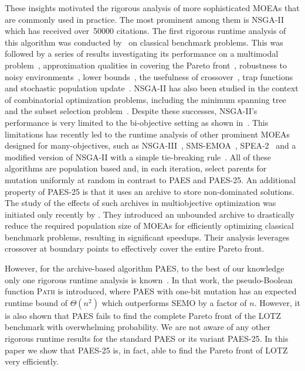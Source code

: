 \documentclass[
sigconf = false, %
review = false, %
screen = true, %
anonymous = true, %
format=acmsmall
]{acmart}
\newcommand{\LOTZ}{\textsc{LOTZ}\xspace}
\newcommand{\PAES}{PAES-25\xspace}
\begin{document}
These insights motivated the rigorous analysis of more sophisticated MOEAs that are commonly used in practice. The most prominent among them is NSGA-II~\cite{DebPAM02} which has received over~50000 citations. The first rigorous runtime analysis of this algorithm was conducted by~\citet{ZhengLuiDoerrAAAI22} on classical benchmark problems. This was followed by a series of results investigating its performance on a multimodal problem~\cite{Qu2022PPSN}, approximation qualities in covering the Pareto front~\citep{DoerrApprox}, robustness to noisy environments~\cite{DaOp2023}, lower bounds~\cite{DoerrQu2023a}, the usefulness of crossover~\citep{Dang2024,DoerrQu2022}, trap functions~\cite{DangEfficient2024} and stochastic population update~\cite{UpBian}. NSGA-II has also been studied in the context of combinatorial optimization problems, including the minimum spanning tree~\cite{DBLP:conf/ijcai/CerfDHKW23} and the subset selection problem~\cite{MOEASubset}. Despite these successes, NSGA-II's performance is very limited to the bi-objective setting as shown in~\cite{Zheng2023Inefficiency}. This limitations has recently led to the runtime analysis of other prominent MOEAs designed for many-objectives, such as NSGA-III~\cite{WiethegerD23,OprisNSGAIII,Opris2025,opris2025multimodal}, SMS-EMOA~\cite{Zheng_Doerr_2024}, SPEA-2~\cite{RenBLQ24} and a modified version of NSGA-II with a simple tie-breaking rule~\cite{Krejca2025b}. All of these algorithms are population based and, in each iteration, select parents for mutation uniformly at random in contrast to PAES and \PAES. An additional property of \PAES is that it uses an archive to store non-dominated solutions. The study of the effects of such archives in multiobjective optimization was initiated only recently by \citet{ArchiveMOEAs}. They introduced an unbounded archive to drastically reduce the required population size of MOEAs for efficiently optimizing classical benchmark problems, resulting in significant speedups. Their analysis leverages crossover at boundary points to effectively cover the entire Pareto front. 

However, for the archive-based algorithm PAES, to the best of our knowledge only one rigorous runtime analysis is known~\cite{PAESFIRST}. In that work, the pseudo-Boolean function \textsc{Path} is introduced, where PAES with one-bit mutation has an expected runtime bound of $\Theta(n^2)$ which outperforms SEMO by a factor of $n$. However, it is also shown that PAES fails to find the complete Pareto front of the \LOTZ benchmark with overwhelming probability. We are not aware of any other rigorous runtime results for the standard PAES or its variant \PAES. In this paper we show that \PAES is, in fact, able to find the Pareto front of \LOTZ very efficiently. 
\end{document}
